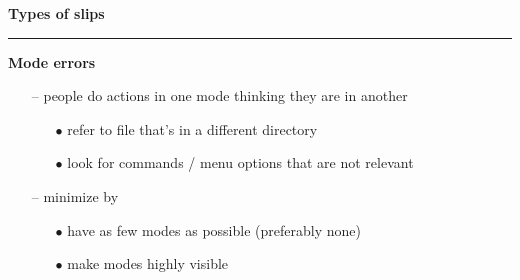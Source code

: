 \documentclass[pdf]{beamer}
\begin{document}
\begin{frame}
{\textbf{Types of slips}}{\textcolor{red}{\rule{12cm}{1.2pt}}}

	\textbf{Mode errors}
	\begin{itemize}
    	\item[--] people do actions in one mode thinking they are in another
		\begin{itemize}
        	\item[$\bullet$]refer to file that’s in a different directory
			\item[$\bullet$]look for commands / menu options that are not relevant \newline
        \end{itemize}
        
        \item[--] minimize by
        \begin{itemize}
        	\item[$\bullet$]have as few modes as possible (preferably none)
			\item[$\bullet$]make modes highly visible\newline\newline \newline\newline  \newline\newline
        \end{itemize}
	\end{itemize}
	
\end{frame}
\end{document}
